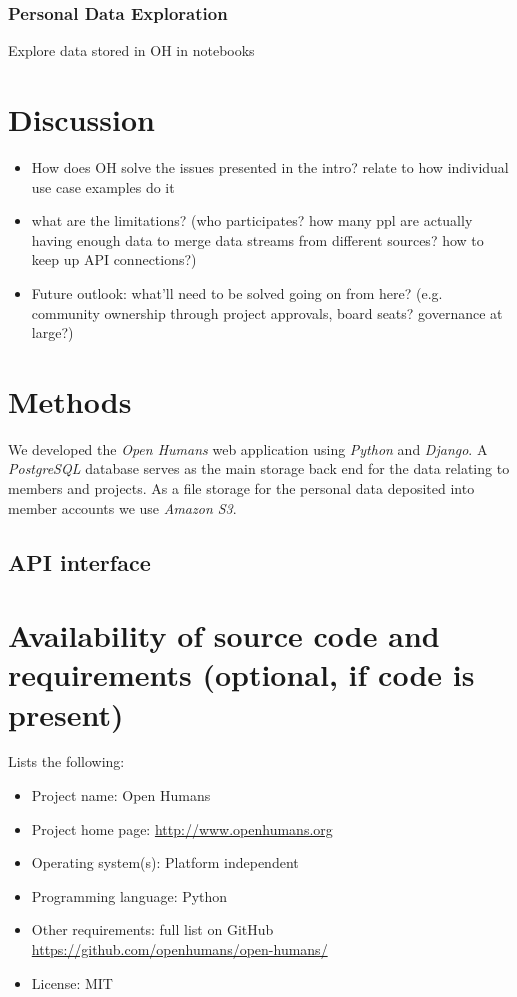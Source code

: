 \documentclass[a4paper,num-refs]{oup-contemporary}
\begin{document}
\subsubsection{Personal Data Exploration}
Explore data stored in OH in notebooks 

\section{Discussion}

\begin{itemize}
    \item How does OH solve the issues presented in the intro? relate to how individual use case examples do it
    \item what are the limitations? (who participates? how many ppl are actually having enough data to merge data streams from different sources? how to keep up API connections?) 
    \item Future outlook: what'll need to be solved going on from here? (e.g. community ownership through project approvals, board seats? governance at large?) 
\end{itemize}


\section{Methods}

We developed the \textit{Open Humans} web application using \textit{Python} and \textit{Django}. A \textit{PostgreSQL} database serves as the main storage back end for the data relating to members and projects. As a file storage for the personal data deposited into member accounts we use \textit{Amazon S3}. 

\subsection{API interface}


\section{Availability of source code and requirements (optional, if code is present)}

Lists the following:
\begin{itemize}
\item Project name: Open Humans
\item Project home page: \url{http://www.openhumans.org}
\item Operating system(s): Platform independent
\item Programming language: Python
\item Other requirements: full list on GitHub \url{https://github.com/openhumans/open-humans/}
\item License: MIT
\end{itemize}
\end{document}

